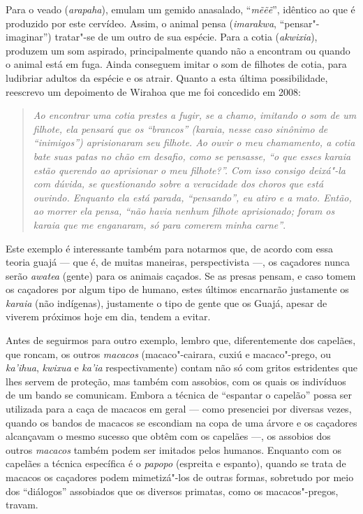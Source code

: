 Para o veado (\emph{arapaha}), emulam um gemido anasalado,
``\emph{mẽẽẽ}'', idêntico ao que é produzido por este cervídeo. Assim, o
animal pensa (\emph{imarakwa}, ``pensar"-imaginar'') tratar"-se de um
outro de sua espécie. Para a cotia (\emph{akwixia}), produzem um som
aspirado, principalmente quando não a encontram ou quando o animal está
em fuga. Ainda conseguem imitar o som de filhotes de cotia, para
ludibriar adultos da espécie e os atrair. Quanto a esta última
possibilidade, reescrevo um depoimento de Wirahoa que me foi concedido
em 2008:

\begin{quote}
\emph{Ao encontrar uma cotia prestes a fugir, se a chamo, imitando o som de
um filhote, ela pensará que os ``brancos'' (\emph{karaia}, nesse caso
sinônimo de ``inimigos'') aprisionaram seu filhote. Ao ouvir o meu
chamamento, a cotia bate suas patas no chão em desafio, como se
pensasse, ``o que esses \emph{karaia} estão querendo ao aprisionar o meu
filhote?''. Com isso consigo deixá"-la com dúvida, se questionando sobre a
veracidade dos choros que está ouvindo. Enquanto ela está parada,
``pensando'', eu atiro e a mato. Então, ao morrer ela pensa, ``não havia
nenhum filhote aprisionado; foram os \emph{karaia} que me enganaram, só
para comerem minha carne''}.
\end{quote}

Este exemplo é interessante também para notarmos que, de acordo com essa
teoria guajá --- que é, de muitas maneiras, perspectivista ---, os caçadores
nunca serão \emph{awatea} (gente) para os animais caçados. Se as presas
pensam, e caso tomem os caçadores por algum tipo de humano, estes
últimos encarnarão justamente os \emph{karaia} (não indígenas),
justamente o tipo de gente que os Guajá, apesar de viverem próximos hoje
em dia, tendem a evitar.

Antes de seguirmos para outro exemplo, lembro que, diferentemente dos
capelães, que roncam, os outros \emph{macacos} (macaco"-cairara, cuxiú e
macaco"-prego, ou \emph{ka'ihua}, \emph{kwixua} e \emph{ka'ia}
respectivamente) contam não só com gritos estridentes que lhes servem de
proteção, mas também com assobios, com os quais os indivíduos de um
bando se comunicam. Embora a técnica de ``espantar o capelão'' possa ser
utilizada para a caça de macacos em geral --- como presenciei por diversas
vezes, quando os bandos de macacos se escondiam na copa de uma árvore e
os caçadores alcançavam o mesmo sucesso que obtêm com os capelães ---, os
assobios dos outros \emph{macacos} também podem ser imitados pelos
humanos. Enquanto com os capelães a técnica específica é o \emph{papopo}
(espreita e espanto), quando se trata de macacos os caçadores podem
mimetizá"-los de outras formas, sobretudo por meio dos ``diálogos''
assobiados que os diversos primatas, como os macacos"-pregos, travam.

